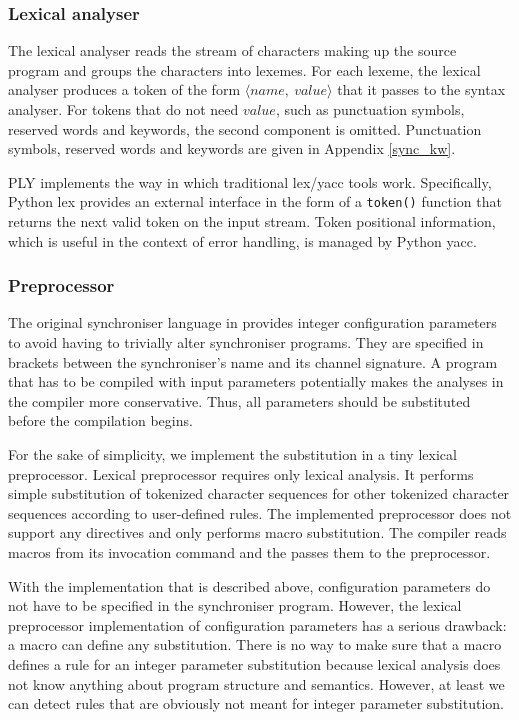   \subsubsection{Lexical analyser}
The lexical analyser reads the stream of characters making up the source program and groups the characters into lexemes. For each lexeme, the lexical analyser produces a token of the form $\langle name, \: value \rangle$ that it passes to the syntax analyser. For tokens that do not need $value$, such as punctuation symbols, reserved words and keywords, the second component is omitted. Punctuation symbols, reserved words and keywords are given in Appendix \ref{sync_kw}.

PLY implements the way in which traditional lex/yacc tools work. Specifically, Python lex provides an external interface in the form of a \texttt{token()} function that returns the next valid token on the input stream. Token positional information, which is useful in the context of error handling, is managed by Python yacc.

  \subsubsection{Preprocessor}
The original synchroniser language in \cite{astrakahn} provides integer configuration parameters to avoid having to trivially alter synchroniser programs. They are specified in brackets between the synchroniser's name and its channel signature. A program that has to be compiled with input parameters potentially makes the analyses in the compiler more conservative. Thus, all parameters should be substituted before the compilation begins.

For the sake of simplicity, we implement the substitution in a tiny lexical preprocessor. Lexical preprocessor requires only lexical analysis. It performs simple substitution of tokenized character sequences for other tokenized character sequences according to user-defined rules. The implemented preprocessor does not support any directives and only performs macro substitution. The compiler reads macros from its invocation command and the passes them to the preprocessor.

With the implementation that is described above, configuration parameters do not have to be specified in the synchroniser program. However, the lexical preprocessor implementation of configuration parameters has a serious drawback: a macro can define any substitution. There is no way to make sure that a macro defines a rule for an integer parameter substitution because lexical analysis does not know anything about program structure and semantics. However, at least we can detect rules that are obviously not meant for integer parameter substitution.

